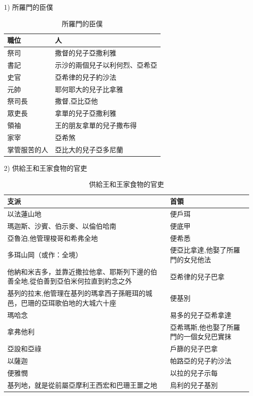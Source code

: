 \documentclass{ctexart}
\begin{document}
\begin{description}
\item  1) 所羅門的臣僕
\begin{table}[!hbp]
\centering
\begin{tabular}{|p{3cm}|p{6cm}|}
\hline
\hline
職位   &  人 \\\hline\hline
祭司&撒督的兒子亞撒利雅\\\hline
 書記              &示沙的兩個兒子以利何烈、亞希亞\\\hline
  史官                     &亞希律的兒子約沙法\\\hline
 元帥&耶何耶大的兒子比拿雅\\\hline
 祭司長  & 撒督,亞比亞他\\\hline
眾吏長  & 拿單的兒子亞撒利雅\\\hline
  領袖 & 王的朋友拿單的兒子撒布得\\\hline
   家宰  &亞希煞 \\\hline
 掌管服苦的人 &亞比大的兒子亞多尼蘭 \\\hline
 \end{tabular}
\caption{所羅門的臣僕}
\end{table}
 
\item  2) 供給王和王家食物的官吏 
 \begin{table}[!hbp]
\centering
\begin{tabular}{|p{8cm}|p{8cm}|}
\hline
\hline
支派   & 首領 \\\hline\hline
 以法蓮山地  &便戶珥 \\\hline 
  瑪迦斯、沙賓、伯示麥、以倫伯哈南  &便底甲 \\\hline
 亞魯泊,他管理梭哥和希弗全地 & 便希悉\\\hline
 多珥山岡（或作：全境）  & 便亞比拿達,他娶了所羅門的女兒他法\\\hline  
  他納和米吉多，並靠近撒拉他拿、耶斯列下邊的伯善全地,從伯善到亞伯米何拉直到約念之外   &亞希律的兒子巴拿 \\\hline
基列的拉末,他管理在基列的瑪拿西子孫睚珥的城邑，巴珊的亞珥歌伯地的大城六十座  & 便基別\\\hline
  瑪哈念 &易多的兒子亞希拿達 \\\hline 
  拿弗他利    & 亞希瑪斯,他也娶了所羅門的一個女兒巴實抹\\\hline 
  亞設和亞祿       & 戶篩的兒子巴拿\\\hline 
     以薩迦       &帕路亞的兒子約沙法 \\\hline 
     便雅憫          & 以拉的兒子示每\\\hline 
       基列地，就是從前屬亞摩利王西宏和巴珊王噩之地           &烏利的兒子基別 \\\hline 
\end{tabular}
\caption{供給王和王家食物的官吏}
\end{table}


\end{description}
\end{document}
